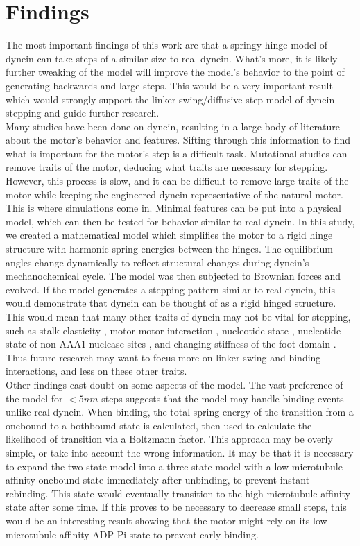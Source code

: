 \documentclass[
11pt, %
english, %
singlespacing, %
headsepline, %
chapterinoneline, %
]{MastersDoctoralThesis} %
\begin{document}
\section{Findings}
The most important findings of this work are that a springy hinge model of dynein can take steps of a similar size to real dynein. What's more, it is likely further tweaking of the model will improve the model's behavior to the point of generating backwards and large steps. This would be a very important result which would strongly support the linker-swing/diffusive-step model of dynein stepping and guide further research.\\

Many studies have been done on dynein, resulting in a large body of literature about the motor's behavior and features. Sifting through this information to find what is important for the motor's step is a difficult task. Mutational studies can remove traits of the motor, deducing what traits are necessary for stepping. However, this process is slow, and it can be difficult to remove large traits of the motor while keeping the engineered dynein representative of the natural motor. This is where simulations come in. Minimal features can be put into a physical model, which can then be tested for behavior similar to real dynein. In this study, we created a mathematical model which simplifies the motor to a rigid hinge structure with harmonic spring energies between the hinges. The equilibrium angles change dynamically to reflect structural changes during dynein's mechanochemical cycle. The model was then subjected to Brownian forces and evolved. If the model generates a stepping pattern similar to real dynein, this would demonstrate that dynein can be thought of as a rigid hinged structure. This would mean that many other traits of dynein may not be vital for stepping, such as stalk elasticity \cite{sarlahmodel}, motor-motor interaction \cite{sarlahmodel}, nucleotide state \cite{cianfroccoreview}, nucleotide state of non-AAA1 nuclease sites \cite{cianfroccoreview}, and changing stiffness of the foot domain \cite{burgess-paper}. Thus future research may want to focus more on linker swing and binding interactions, and less on these other traits.\\

Other findings cast doubt on some aspects of the model. The vast preference of the model for $<5nm$ steps suggests that the model may handle binding events unlike real dynein. When binding, the total spring energy of the transition from a onebound to a bothbound state is calculated, then used to calculate the likelihood of transition via a Boltzmann factor. This approach may be overly simple, or take into account the wrong information. It may be that it is necessary to expand the two-state model into a three-state model with a low-microtubule-affinity onebound state immediately after unbinding, to prevent instant rebinding. This state would eventually transition to the high-microtubule-affinity state after some time. If this proves to be necessary to decrease small steps, this would be an interesting result showing that the motor might rely on its low-microtubule-affinity ADP-Pi state to prevent early binding.\\
\end{document}
